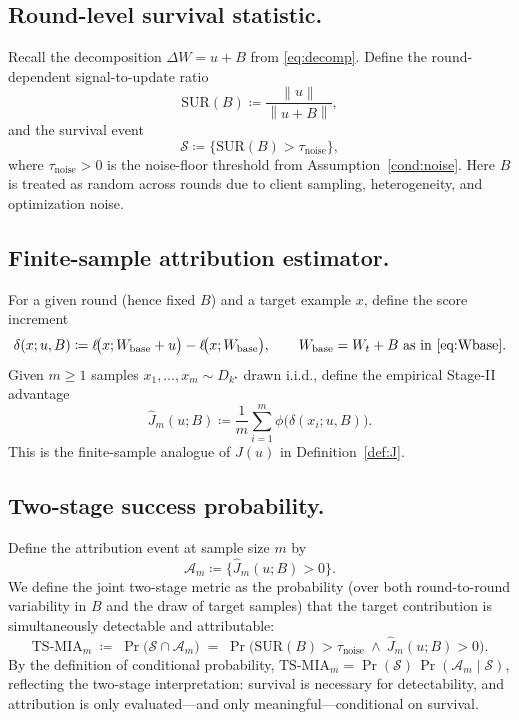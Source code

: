\documentclass{article}
\theoremstyle{plain}
\theoremstyle{definition}
\theoremstyle{remark}
\numberwithin{theorem}{section}
\numberwithin{definition}{section}
\numberwithin{remark}{section}
\numberwithin{lemma}{section}
\numberwithin{assumption}{section}
\newcommand{\norm}[1]{\left\lVert #1 \right\rVert}
\newcommand{\tindex}{k^\star}
\newcommand{\utarget}{u}
\begin{document}
\subsection{Round-level survival statistic.}
Recall the decomposition $\Delta W=\utarget+B$ from \eqref{eq:decomp}.
Define the round-dependent signal-to-update ratio
\begin{equation}
\label{eq:sur_B}
\mathrm{SUR}(B)\coloneqq \frac{\norm{\utarget}}{\norm{\utarget+B}},
\end{equation}
and the survival event
\begin{equation}
\label{eq:event_survival}
\mathcal{S}\coloneqq \{\mathrm{SUR}(B)>\tau_{\mathrm{noise}}\},
\end{equation}
where $\tau_{\mathrm{noise}}>0$ is the noise-floor threshold from Assumption~\ref{cond:noise}.
Here $B$ is treated as random across rounds due to client sampling, heterogeneity, and optimization noise.

\subsection{Finite-sample attribution estimator.}
For a given round (hence fixed $B$) and a target example $x$, define the score increment
\begin{equation}
\label{eq:delta_B}
\delta(x;\utarget,B)\coloneqq \ell\!\big(x;W_{\mathrm{base}}+\utarget\big)-\ell\!\big(x;W_{\mathrm{base}}\big),
\qquad W_{\mathrm{base}}=W_t+B \ \text{as in \eqref{eq:Wbase}}.
\end{equation}
Given $m\ge 1$ samples $x_1,\dots,x_m\sim D_{\tindex}$ drawn i.i.d., define the empirical Stage-II advantage
\begin{equation}
\label{eq:Jhat}
\widehat{J}_m(\utarget;B)
\coloneqq
\frac{1}{m}\sum_{i=1}^m \phi\!\big(\delta(x_i;\utarget,B)\big).
\end{equation}
This is the finite-sample analogue of $J(\utarget)$ in Definition~\ref{def:J}.

\subsection{Two-stage success probability.}
Define the attribution event at sample size $m$ by
\begin{equation}
\label{eq:event_attr}
\mathcal{A}_m\coloneqq \{\widehat{J}_m(\utarget;B)>0\}.
\end{equation}
We define the joint two-stage metric as the probability (over both round-to-round variability in $B$ and the draw of target samples)
that the target contribution is simultaneously detectable and attributable:
\begin{equation}
\label{eq:two_stage_metric}
\mathrm{TS\text{-}MIA}_m
\;\coloneqq\;
\Pr\big(\mathcal{S}\cap \mathcal{A}_m\big)
\;=\;
\Pr\!\big(\mathrm{SUR}(B)>\tau_{\mathrm{noise}} \ \wedge\  \widehat{J}_m(\utarget;B)>0\big).
\end{equation}
By the definition of conditional probability, $\mathrm{TS\text{-}MIA}_m=\Pr(\mathcal{S})\,\Pr(\mathcal{A}_m\mid \mathcal{S})$, reflecting the two-stage interpretation:
survival is necessary for detectability, and attribution is only evaluated---and only meaningful---conditional on survival.
\end{document}

